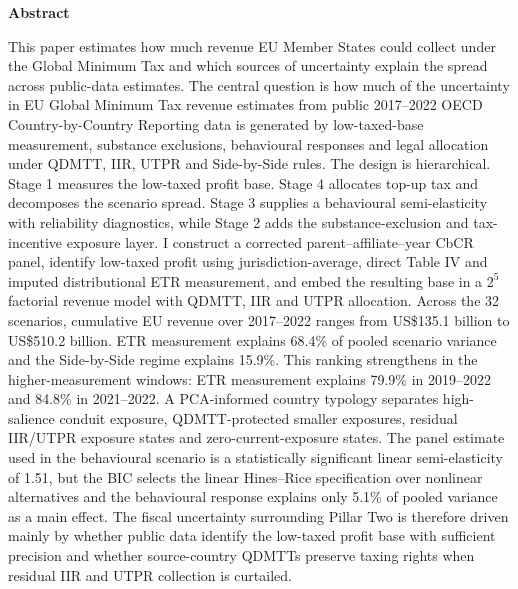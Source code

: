 \documentclass[11pt,a4paper]{article}
\begin{document}
\newpage
\thispagestyle{plain}
\setcounter{page}{1}

{}
\begin{center}
  {\large\bfseries Abstract}
\end{center}

\noindent

This paper estimates how much revenue EU Member States could collect under the Global Minimum Tax and which sources of uncertainty explain the spread across public-data estimates. The central question is how much of the uncertainty in EU Global Minimum Tax revenue estimates from public 2017--2022 OECD Country-by-Country Reporting data is generated by low-taxed-base measurement, substance exclusions, behavioural responses and legal allocation under QDMTT, IIR, UTPR and Side-by-Side rules. The design is hierarchical. Stage 1 measures the low-taxed profit base. Stage 4 allocates top-up tax and decomposes the scenario spread. Stage 3 supplies a behavioural semi-elasticity with reliability diagnostics, while Stage 2 adds the substance-exclusion and tax-incentive exposure layer. I construct a corrected parent--affiliate--year CbCR panel, identify low-taxed profit using jurisdiction-average, direct Table IV and imputed distributional ETR measurement, and embed the resulting base in a $2^5$ factorial revenue model with QDMTT, IIR and UTPR allocation. Across the 32 scenarios, cumulative EU revenue over 2017--2022 ranges from US\$135.1 billion to US\$510.2 billion. ETR measurement explains 68.4\% of pooled scenario variance and the Side-by-Side regime explains 15.9\%. This ranking strengthens in the higher-measurement windows: ETR measurement explains 79.9\% in 2019--2022 and 84.8\% in 2021--2022. A PCA-informed country typology separates high-salience conduit exposure, QDMTT-protected smaller exposures, residual IIR/UTPR exposure states and zero-current-exposure states. The panel estimate used in the behavioural scenario is a statistically significant linear semi-elasticity of 1.51, but the BIC selects the linear Hines--Rice specification over nonlinear alternatives and the behavioural response explains only 5.1\% of pooled variance as a main effect. The fiscal uncertainty surrounding Pillar Two is therefore driven mainly by whether public data identify the low-taxed profit base with sufficient precision and whether source-country QDMTTs preserve taxing rights when residual IIR and UTPR collection is curtailed.

\newpage
\end{document}
